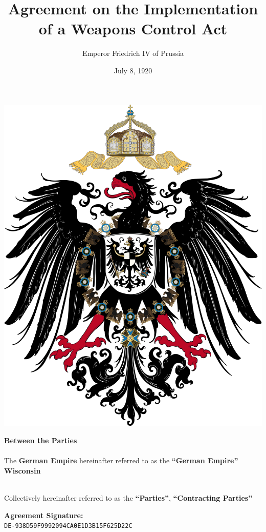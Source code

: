 \documentclass{article}
\title{Agreement on the Implementation of a Weapons Control Act}
\author{Emperor Friedrich IV of Prussia}
\date{July 8, 1920}
\begin{document}
\maketitle
\begin{center}
    \includegraphics[scale=.15]{dr_wappen}
\end{center}
\begin{center}
    \textbf{Between the Parties\\}\textbf{\\}
    The \textbf{German Empire} hereinafter referred to as the \textbf{``German Empire''\\}
    \textbf{Wisconsin\\}\textbf{\\}

    Collectively hereinafter referred to as the \textbf{``Parties''}, \textbf{``Contracting Parties''}
\end{center}
\newpage
{}
\vspace*{\fill}
\begin{Center}
\textbf{Agreement Signature:\\}
\texttt{DE-938D59F9992094CA0E1D3B15F625D22C}
\vspace*{\fill}
\end{Center}
\newpage
\tableofcontents
\newpage
\end{document}
